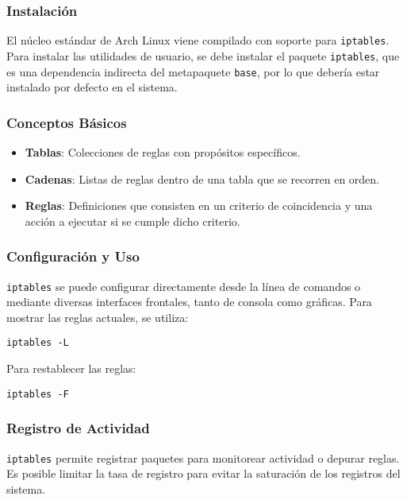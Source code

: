 \subsubsection{Instalación}

El núcleo estándar de Arch Linux viene compilado con soporte para \texttt{iptables}. Para instalar las utilidades de usuario, se debe instalar el paquete \texttt{iptables}, que es una dependencia indirecta del metapaquete \texttt{base}, por lo que debería estar instalado por defecto en el sistema. 

\subsubsection{Conceptos Básicos}

\begin{itemize}
    \item \textbf{Tablas}: Colecciones de reglas con propósitos específicos.
    \item \textbf{Cadenas}: Listas de reglas dentro de una tabla que se recorren en orden.
    \item \textbf{Reglas}: Definiciones que consisten en un criterio de coincidencia y una acción a ejecutar si se cumple dicho criterio.
\end{itemize}

\subsubsection{Configuración y Uso}

\texttt{iptables} se puede configurar directamente desde la línea de comandos o mediante diversas interfaces frontales, tanto de consola como gráficas. Para mostrar las reglas actuales, se utiliza:

\begin{verbatim}
iptables -L
\end{verbatim}

Para restablecer las reglas:

\begin{verbatim}
iptables -F
\end{verbatim}

\subsubsection{Registro de Actividad}

\texttt{iptables} permite registrar paquetes para monitorear actividad o depurar reglas. Es posible limitar la tasa de registro para evitar la saturación de los registros del sistema. 
